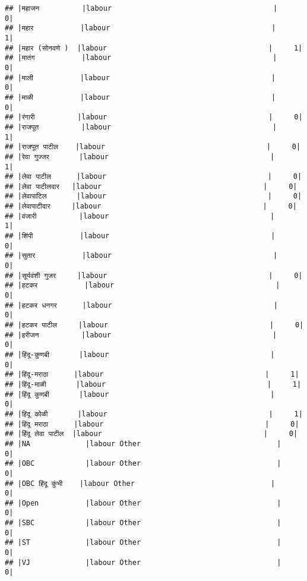 \documentclass[
]{article}
\begin{document}
\begin{verbatim}
## |महाजन          |labour                                      |     0|
## |महार           |labour                                      |     1|
## |महार (सोनवणे )  |labour                                      |     1|
## |मातंग           |labour                                      |     0|
## |माली           |labour                                      |     0|
## |माळी           |labour                                      |     0|
## |रंगारी          |labour                                      |     0|
## |राजपूत          |labour                                      |     1|
## |राजपूत पाटील    |labour                                      |     0|
## |रेवा गुज्जर       |labour                                      |     1|
## |लेवा पाटील      |labour                                      |     0|
## |लेवा पाटीलदार   |labour                                      |     0|
## |लेवापाटिल       |labour                                      |     0|
## |लेवापाटीदार     |labour                                      |     0|
## |वंजारी          |labour                                      |     1|
## |शिंपी           |labour                                      |     0|
## |सुतार           |labour                                      |     0|
## |सूर्यवंशी गुजर     |labour                                      |     0|
## |हटकर           |labour                                      |     0|
## |हटकर धनगर      |labour                                      |     0|
## |हटकर पाटील     |labour                                      |     0|
## |हरीजन          |labour                                      |     0|
## |हिंदू-कुणबी       |labour                                      |     0|
## |हिंदू-मराठा      |labour                                      |     1|
## |हिंदू-माळी       |labour                                      |     1|
## |हिंदू कुणबी       |labour                                      |     0|
## |हिंदू कोळी       |labour                                      |     1|
## |हिंदू मराठा      |labour                                      |     0|
## |हिंदू लेवा पाटील  |labour                                      |     0|
## |NA             |labour Other                                |     0|
## |OBC            |labour Other                                |     0|
## |OBC हिंदू कुंभी    |labour Other                                |     0|
## |Open           |labour Other                                |     0|
## |SBC            |labour Other                                |     0|
## |ST             |labour Other                                |     0|
## |VJ             |labour Other                                |     0|

\end{verbatim}
\end{document}
